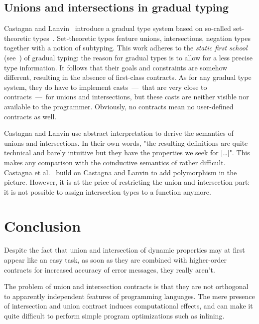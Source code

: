 \documentclass[sigplan,10pt]{acmart}
\begin{document}
\subsection{Unions and intersections in gradual typing}

Castagna and Lanvin~\cite{CastagnaLanvinGradualUnionIntersection} introduce a
gradual type system based on so-called set-theoretic
types~\cite{SetTheoreticTypes}.  Set-theoretic types feature unions,
intersections, negation types together with a notion of subtyping. This work
adheres to the \emph{static first school} (see~\cite{practiceTheoryGrad}) of
gradual typing: the reason for gradual types is to allow for a less precise type
information. It follows that their goals and constraints are somehow different,
resulting in the absence of first-class contracts. As for any gradual type
system, they do have to implement casts~---~that are very close to
contracts~---~for unions and intersections, but these casts are neither visible
nor available to the programmer. Obviously, no contracts mean no user-defined
contracts as well.

Castagna and Lanvin use abstract interpretation to derive the semantics of
unions and intersections. In their own words, "the resulting definitions are
quite technical and barely intuitive but they have the properties we seek for
[\ldots]".  This makes any comparison with the coinductive semantics of
\citeauthor{KeilThiemannUnionIntersection} rather difficult. Castagna et
al.~\cite{gradualCastagna} build on Castagna and Lanvin to add polymorphism in
the picture. However, it is at the price of restricting the union and
intersection part: it is not possible to assign intersection types to a function
anymore.

\section{Conclusion}
\label{sec:conclusion}

Despite the fact that union and intersection of dynamic properties may
at first appear like an easy task, as soon as they are combined with
higher-order contracts for increased accuracy of error messages, they
really aren't.

The problem of union and intersection contracts is that they are not
orthogonal to apparently independent features of programming
languages. The mere presence of intersection and union contract
induces computational effects, and can make it quite difficult to
perform simple program optimizations such as inlining.
\end{document}
